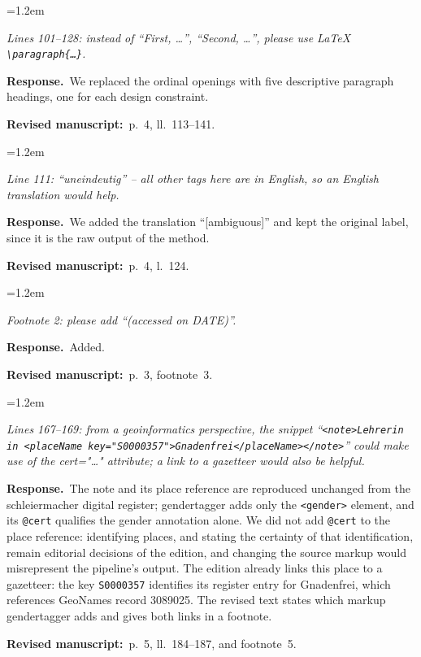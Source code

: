\documentclass[11pt,a4paper]{article}
\newenvironment{reviewercomment}
  {\par\smallskip\begin{list}{}{\leftmargin=1.2em\rightmargin=0pt}\item[]\color{black!75}\itshape}
  {\end{list}\smallskip}
\newcommand{\response}{\par\noindent\textbf{Response.}~}
\newcommand{\where}[1]{\par\noindent\textbf{Revised manuscript:}~#1\par\medskip}
\begin{document}
\begin{enumerate}[label=\textbf{I\arabic*}, leftmargin=2.2em, itemsep=0.8em]
\item
\begin{reviewercomment}
Lines 101--128: instead of ``First, \dots'', ``Second, \dots'', please use LaTeX
\texttt{\textbackslash paragraph\{\dots\}}.
\end{reviewercomment}
\response We replaced the ordinal openings with five descriptive paragraph headings, one for each
design constraint.
\where{p.~4, ll.~113--141.}

\item
\begin{reviewercomment}
Line 111: ``uneindeutig'' -- all other tags here are in English, so an English translation would help.
\end{reviewercomment}
\response We added the translation ``[ambiguous]'' and kept the original label, since it is the raw
output of the method.
\where{p.~4, l.~124.}

\item
\begin{reviewercomment}
Footnote 2: please add ``(accessed on DATE)''.
\end{reviewercomment}
\response Added.
\where{p.~3, footnote~3.}

\item
\begin{reviewercomment}
Lines 167--169: from a geoinformatics perspective, the snippet
``\texttt{<note>Lehrerin in <placeName key="S0000357">Gnadenfrei</placeName></note>}'' could make use of
the cert="\dots" attribute; a link to a gazetteer would also be helpful.
\end{reviewercomment}
\response The note and its place reference are reproduced unchanged from the schleiermacher digital
register; gendertagger adds only the \texttt{<gender>} element, and its \texttt{@cert} qualifies the
gender annotation alone. We did not add \texttt{@cert} to the place reference: identifying places,
and stating the certainty of that identification, remain editorial decisions of the edition, and
changing the source markup would misrepresent the pipeline's output. The edition already links this
place to a gazetteer: the key \texttt{S0000357} identifies its register entry for Gnadenfrei, which
references GeoNames record 3089025. The revised text states which markup gendertagger adds and gives
both links in a footnote.
\where{p.~5, ll.~184--187, and footnote~5.}


\end{enumerate}
\end{document}

